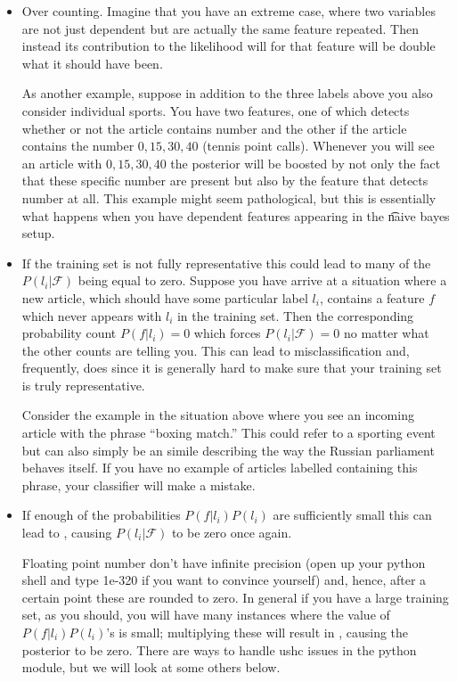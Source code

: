 \begin{itemize}

    \item Over counting. Imagine that you have an extreme case, where two variables are not just dependent but are actually the same feature repeated. Then instead its contribution to the likelihood will for that feature will be double what it should have been.
        
        As another example, suppose in addition to the three labels above you also consider individual sports. You have two features, one of which detects whether or not the article contains number and the other if the article contains the number $0,15,30,40$ (tennis point calls). Whenever you will see an article with $0,15,30,40$ the posterior will be boosted by not only the fact that these specific number are present but also by the feature that detects number at all. This example might seem pathological, but this is essentially what happens when you have dependent features appearing in the \t{naive bayes setup}. 

        
    \item If the training set is not fully representative this could lead to many of the $P(l_i|\mathcal{F})$ being equal to zero. Suppose you have arrive at a situation where a new article, which should have some particular label $l_i$, contains a feature $f$ which never appears with $l_i$ in the training set. Then the corresponding probability count $P(f|l_i)=0$ which forces $P(l_i|\mathcal{F})=0$ no matter what the other counts are telling you. This can lead to misclassification and, frequently, does since it is generally hard to make sure that your training set is truly representative. 

        Consider the example in the situation above where you see an incoming article with the phrase ``boxing match.'' This could refer to a sporting event but can also simply be an simile describing the way the Russian parliament behaves itself. If you have no example of articles labelled  containing this phrase, your classifier will make a mistake.

    \item If enough of the probabilities $P(f|l_i)P(l_i)$ are sufficiently small this can lead to , causing $P(l_i|\mathcal{F})$ to be zero once again.

        Floating point number don't have infinite precision (open up your python shell and type 1e-320 if you want to convince yourself) and, hence, after a certain point these are rounded to zero. In general if you have a large training set, as you should, you will have many instances where the value of  $P(f|l_i)P(l_i)$'s is small; multiplying these will result in , causing the posterior to be zero. There are ways to handle ushc issues in the python  module, but we will look at some others below. 
        
 
\end{itemize}


